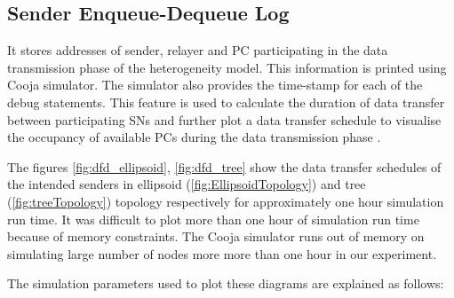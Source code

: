     \subsection*{Sender Enqueue-Dequeue Log}
        
        It stores addresses of sender, relayer and \ac{PC} participating in the data transmission phase of the heterogeneity model. This information is printed using Cooja simulator. The simulator also provides the time-stamp for each of the debug statements. This feature is used to calculate the duration of data transfer between participating \acp{SN} and further plot a data transfer schedule to visualise the occupancy of available \acp{PC} during the data transmission phase \cite{bitencourt2012simulation}. 
        
        The figures \ref{fig:dfd_ellipsoid}, \ref{fig:dfd_tree} show the data transfer schedules of the intended senders in ellipsoid (\ref{fig:EllipsoidTopology}) and tree (\ref{fig:treeTopology}) topology respectively for approximately one hour simulation run time. It was difficult to plot more than one hour of simulation run time because of memory constraints. The Cooja simulator runs out of memory on simulating large number of nodes more more than one hour in our experiment.
        
        \par
        The simulation parameters used to plot these diagrams are explained as follows:
        

